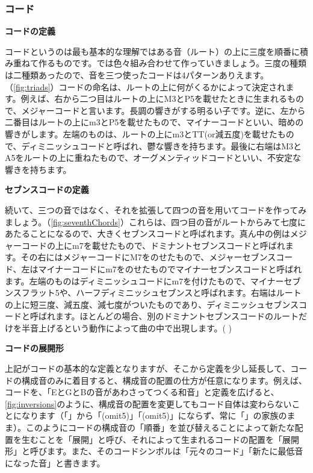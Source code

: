 \documentclass[11pt]{ltjarticle}
\newcommand{\wc}{\writechord}
\begin{document}
\subsubsection{コード}
\textbf{コードの定義}\par
コードというのは最も基本的な理解ではある音（ルート）の上に三度を順番に積み重ねて作るものです。では色々組み合わせて作っていきましょう。三度の種類は二種類あったので、音を三つ使ったコードは4パターンありえます。（\autoref{fig:triads}）コードの命名は、ルートの上に何がくるかによって決定されます。例えば、右から二つ目はルートの上にM3とP5を載せたときに生まれるもので、メジャーコードと言います。長調の響きがする明るい子です。逆に、左から二番目はルートの上にm3とP5を載せたもので、マイナーコードといい、暗めの響きがします。左端のものは、ルートの上にm3とTT(or減五度)を載せたもので、ディミニッシュコードと呼ばれ、鬱な響きを持ちます。最後に右端はM3とA5をルートの上に重ねたもので、オーグメンティッドコードといい、不安定な響きを持ちます。\par
\vspace{10pt}
\textbf{セブンスコードの定義}\par
続いて、三つの音ではなく、それを拡張して四つの音を用いてコードを作ってみましょう。（\autoref{fig:seventhChords}）これらは、四つ目の音がルートからみて七度にあたることになるので、大きくセブンスコードと呼ばれます。真ん中の例はメジャーコードの上にm7を載せたもので、ドミナントセブンスコードと呼ばれます。その右にはメジャーコードにM7をのせたもので、メジャーセブンスコード、左はマイナーコードにm7をのせたものでマイナーセブンスコードと呼ばれます。左端のものはディミニッシュコードにm7を付けたもので、マイナーセブンスフラット5や、ハーフディミニッシュセブンスと呼ばれます。右端はルートの上に短三度、減五度、減七度がついたものであり、ディミニッシュセブンスコードと呼ばれます。ほとんどの場合、別のドミナントセブンスコードのルートだけを半音上げるという動作によって曲の中で出現します。( \rightarrow {})\par
\vspace{10pt}
\textbf{コードの展開形}\par
上記がコードの基本的な定義となりますが、そこから定義を少し延長して、コードの構成音のみに着目すると、構成音の配置の仕方が任意になります。例えば、\wc{E}コードを、「EとG\sh とBの音があわさってつくる和音」と定義を広げると、\autoref{fig:inversions}のように、構成音の配置を変更してもコード自体は変わらないことになります（「\wc{E}」から「\wc{G#(b6)}(omit5)」「\wc{B6sus4}(omit5)」にならず、常に「\wc{E}」の家族のまま）。このようにコードの構成音の「順番」を並び替えることによって新たな配置を生むことを「展開」と呼び、それによって生まれるコードの配置を「展開形」と呼びます。また、そのコードシンボルは「元々のコード」「新たに最低音になった音」と書きます。
\end{document}
